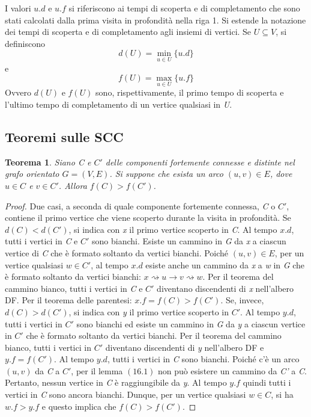 \documentclass[10pt, a4paper]{report}
\newtheorem{theorem}{Teorema}[chapter]
\begin{document}
I valori $u.d$ e $u.f$ si riferiscono ai tempi di scoperta e di completamento che sono stati calcolati dalla prima visita in profondità nella riga 1. Si estende la notazione dei tempi di scoperta e di completamento agli insiemi di vertici. Se $U \subseteq V$, si definiscono
\begin{equation*}
d(U) = \min_{u \in U}\{u.d\}
\end{equation*}
e
\begin{equation*}
f(U) = \max_{u \in U}\{u.f\}
\end{equation*}
Ovvero $d(U)$ e $f(U)$ sono, rispettivamente, il primo tempo di scoperta e l'ultimo tempo di completamento di un vertice qualsiasi in \textit{U}.
\subsection{Teoremi sulle SCC}
\begin{theorem}
Siano \textit{C} e $C'$ delle componenti fortemente connesse e distinte nel grafo orientato $G = (V,E)$. Si suppone che esista un arco $(u,v) \in E$, dove $u \in C$ e $v \in C'$. Allora $f(C) > f(C')$.
\end{theorem}
\begin{proof}
Due casi, a seconda di quale componente fortemente connessa, \textit{C} o $C'$, contiene il primo vertice che viene scoperto durante la visita in profondità. Se $d(C) < d(C')$, si indica con \textit{x} il primo vertice scoperto in \textit{C}. Al tempo $x.d$, tutti i vertici in \textit{C} e $C'$ sono bianchi. Esiste un cammino in \textit{G} da \textit{x} a ciascun vertice di \textit{C} che è formato soltanto da vertici bianchi. Poiché $(u,v) \in E$, per un vertice qualsiasi $w \in C'$, al tempo $x.d$ esiste anche un cammino da \textit{x} a \textit{w} in \textit{G} che è formato soltanto da vertici bianchi: $x \rightsquigarrow u \rightarrow v \rightsquigarrow w$. Per il teorema del cammino bianco, tutti i vertici in \textit{C} e $C'$ diventano discendenti di \textit{x} nell'albero DF. Per il teorema delle parentesi: $x.f = f(C) > f(C')$. Se, invece, $d(C) > d(C')$, si indica con \textit{y} il primo vertice scoperto in $C'$. Al tempo $y.d$, tutti i vertici in $C'$ sono bianchi ed esiste un cammino in \textit{G} da \textit{y} a ciascun vertice in $C'$ che è formato soltanto da vertici bianchi. Per il teorema del cammino bianco, tutti i vertici in $C'$ diventano discendenti di \textit{y} nell'albero DF e $y.f = f(C')$. Al tempo $y.d$, tutti i vertici in \textit{C} sono bianchi. Poiché c'è un arco $(u,v)$ da \textit{C} a $C'$, per il lemma $(16.1)$ non può esistere un cammino da \textit{C'} a \textit{C}. Pertanto, nessun vertice in \textit{C} è raggiungibile da \textit{y}. Al tempo $y.f$ quindi tutti i vertici in \textit{C} sono ancora bianchi. Dunque, per un vertice qualsiasi $w \in C$, si ha $w.f > y.f$ e questo implica che $f(C) > f(C')$.
\end{proof}
\end{document}
